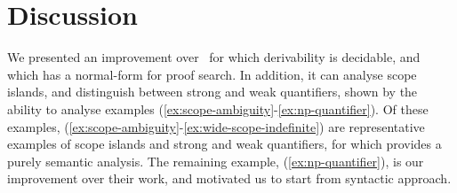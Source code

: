 \documentclass[10pt,a4paper]{llncs}
\begin{document}
\section{Discussion}
We presented an improvement over  \NLCL\ for which
derivability is decidable, and which has a normal-form for proof
search. In addition, it can analyse scope islands, and distinguish
between strong and weak quantifiers, shown by the ability to analyse
examples (\ref{ex:scope-ambiguity}-\ref{ex:np-quantifier}).
Of these examples, (\ref{ex:scope-ambiguity}-\ref{ex:wide-scope-indefinite})
are representative examples of scope islands and strong and weak
quantifiers, for which \citet{kiselyov2014} provides a purely semantic
analysis. The remaining example, (\ref{ex:np-quantifier}), is our
improvement over their work, and motivated us to start from
 syntactic approach.



\end{document}
